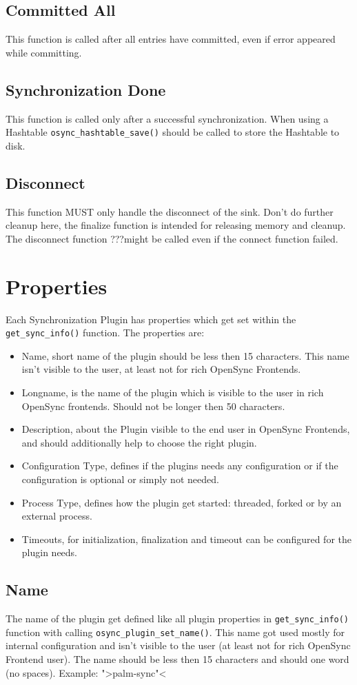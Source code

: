 \subsection{Committed All}
This function is called after all entries have committed, even if error appeared
while committing.
\subsection{Synchronization Done}
This function is called only after a successful synchronization.  When using a
Hashtable \verb|osync_hashtable_save()| should be called to store the Hashtable
to disk.
\subsection{Disconnect}
This function MUST only handle the disconnect of the sink. Don't do further
cleanup here, the finalize function is intended for releasing memory and
cleanup. The disconnect function ???might be called even if the connect
function failed.
\section{Properties}
Each Synchronization Plugin has properties which get set within the
\verb|get_sync_info()| function. The properties are:

\begin{itemize}
\item Name, short name of the plugin should be less then 15 characters. This
name isn't visible to the user, at least not for rich OpenSync Frontends.
\item Longname, is the name of the plugin which is visible to the user in
rich OpenSync frontends. Should not be longer then 50 characters.
\item Description, about the Plugin visible to the end user in OpenSync
Frontends, and should additionally help to choose the right plugin.
\item Configuration Type, defines if the plugins needs any configuration or if
the configuration is optional or simply not needed.
\item Process Type, defines how the plugin get started: threaded, forked or by 
an external process.
\item Timeouts, for initialization, finalization and timeout can be configured
for the plugin needs. 
\end{itemize}

\subsection{Name}
The name of the plugin get defined like all plugin properties in
\verb|get_sync_info()| function with calling \verb|osync_plugin_set_name()|.
This name got used mostly for internal configuration and isn't visible to the 
user (at least not for rich OpenSync Frontend user). The name should be less
then 15 characters and should one word (no spaces). Example: ">palm-sync"<
